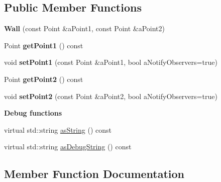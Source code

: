 \subsection*{Public Member Functions}
\begin{DoxyCompactItemize}
\item 
{\bfseries Wall} (const Point \&a\+Point1, const Point \&a\+Point2)\hypertarget{class_model_1_1_wall_ac0b46ab42d2beb30c8615a151e7fddf9}{}\label{class_model_1_1_wall_ac0b46ab42d2beb30c8615a151e7fddf9}

\item 
Point {\bfseries get\+Point1} () const \hypertarget{class_model_1_1_wall_acb2fdae8d93a301f6e2b4373abe7c07f}{}\label{class_model_1_1_wall_acb2fdae8d93a301f6e2b4373abe7c07f}

\item 
void {\bfseries set\+Point1} (const Point \&a\+Point1, bool a\+Notify\+Observers=true)\hypertarget{class_model_1_1_wall_a33faa9568601b27a7d26b0120240aa5d}{}\label{class_model_1_1_wall_a33faa9568601b27a7d26b0120240aa5d}

\item 
Point {\bfseries get\+Point2} () const \hypertarget{class_model_1_1_wall_a48f2077a03eaa993c6a10df293a43147}{}\label{class_model_1_1_wall_a48f2077a03eaa993c6a10df293a43147}

\item 
void {\bfseries set\+Point2} (const Point \&a\+Point2, bool a\+Notify\+Observers=true)\hypertarget{class_model_1_1_wall_a09daf2452415fa71a038150deb4d3246}{}\label{class_model_1_1_wall_a09daf2452415fa71a038150deb4d3246}

\end{DoxyCompactItemize}
\begin{Indent}{\bf Debug functions}\par
\begin{DoxyCompactItemize}
\item 
virtual std\+::string \hyperlink{class_model_1_1_wall_af537e51905929a5b583ed5f91e60096b}{as\+String} () const 
\item 
virtual std\+::string \hyperlink{class_model_1_1_wall_a298bfdfe9f2d9d637d53b233ec431277}{as\+Debug\+String} () const 
\end{DoxyCompactItemize}
\end{Indent}


\subsection{Member Function Documentation}
